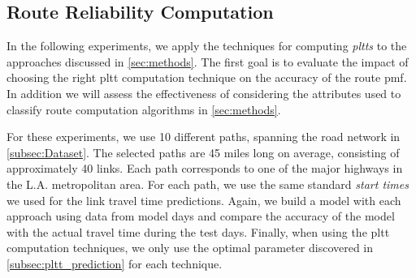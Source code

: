 \vspace{-0.1in}
\subsection{Route Reliability Computation}
In the following experiments, we apply the techniques for computing
\textit{pltts} to the approaches discussed in \cref{sec:methods}. The first goal
is to evaluate the impact of choosing the right pltt computation technique on
the accuracy of the route pmf. In addition we will assess the effectiveness of
considering the attributes used to classify route computation algorithms in
\cref{sec:methods}.

For these experiments, we use 10 different paths, spanning the road network in
\cref{subsec:Dataset}. The selected paths are 45 miles long on average, consisting of
approximately 40 links. Each path corresponds to one of the major highways in the L.A. metropolitan area. For each path, we use the same standard \textit{start
times} we used for the link travel time predictions. Again, we build a model
with each approach using data from model days and compare the accuracy of the
model with the actual travel time during the test days. Finally, when using the
pltt computation techniques, we only use the optimal parameter discovered in
\cref{subsec:pltt_prediction} for each technique.

